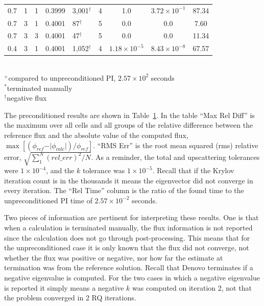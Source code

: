\begin{table}[!h]
\begin{center}
\begin{tabular}{| c | c | c | c | l | c | c | c | c |}
\hline
0.7 & 1 & 1 & 0.3999 & 3,001$^{\dag}$ & 4 & 1.0 & $3.72 \times 10^{-1}$ & 87.34 \\ %
0.7 & 3 & 1 & 0.4001 & 87$^{\dag}$      & 5 & 0.0 & 0.0 & 7.60 \\ %
0.7 & 3 & 3 & 0.4001 & 47$^{\dag}$      & 5 & 0.0 & 0.0 & 11.34 \\ %
0.4 & 3 & 1 & 0.4001 & 1,052$^{\dag}$ & 4 & $1.18 \times 10^{-5}$ & $8.43 \times 10^{-8}$      & 67.57 \\ %
\hline 
\end{tabular}\\
$^{+}$compared to unpreconditioned PI, $2.57 \times 10^{2}$ seconds\\
$^{*}$terminated manually\\
$^{\dag}$negative flux
\end{center}
\label{table:impi RQI}
\end{table}
%
The preconditioned results are shown in Table~\ref{table:impi RQI}. In the table ``Max Rel Diff'' is the maximum over all cells and all groups of the relative difference between the reference flux and the absolute value of the computed flux, $\max[ (\phi_{ref} - \vert\phi_{calc}\vert) / \phi_{ref}]$. ``RMS Err'' is the root mean squared (rms) relative error, $\sqrt{ \sum_{1}^{N}(rel\_err)^{2} / N}$. As a reminder, the total and upscattering tolerances were $1 \times 10^{-4}$, and the $k$ tolerance was $1 \times 10^{-5}$. Recall that if the Krylov iteration count is in the thousands it means the eigenvector did not converge in every iteration. The ``Rel Time'' column is the ratio of the found time to the unpreconditioned PI time of $2.57 \times 10^{-2}$ seconds.

Two pieces of information are pertinent for interpreting these results. One is that when a calculation is terminated manually, the flux information is not reported since the calculation does not go through post-processing. This means that for the unpreconditioned case it is only known that the flux did not converge, not whether the flux was positive or negative, nor how far the estimate at termination was from the reference solution. Recall that Denovo terminates if a negative eigenvalue is computed. For the two cases in which a negative eigenvalue is reported it simply means a negative $k$ was computed on iteration 2, not that the problem converged in 2 RQ iterations. 

